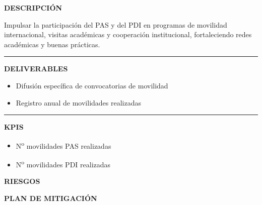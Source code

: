\documentclass[11pt,a4paper]{scrreprt}
\newcommand{\fieldlabel}[1]{%
  {\footnotesize\sffamily\bfseries\color{mutedcolor}\MakeUppercase{#1}}\par\nopagebreak[4]
}
\newcommand{\fieldsep}{\vspace{3pt}\noindent\textcolor{bordercolor}{\rule{\linewidth}{0.4pt}}\vspace{3pt}\par}
\begin{document}
\begin{tcolorbox}[pabox={fgcolor}{PA5.2 \enspace\textbullet\enspace Fomentar la movilidad de PAS y PDI}]

\fieldlabel{Descripci\'on}
{\small Impulsar la participación del PAS y del PDI en programas de movilidad internacional, visitas académicas y cooperación institucional, fortaleciendo redes académicas y buenas prácticas.}\par
\fieldsep
\fieldlabel{Deliverables}
{\small \begin{itemize}[noitemsep,topsep=2pt]
\item Difusión específica de convocatorias de movilidad
\item Registro anual de movilidades realizadas
\end{itemize}}\par
\fieldsep
\fieldlabel{KPIs}
{\small \begin{itemize}[noitemsep,topsep=2pt]
\item N\textsuperscript{o} movilidades PAS realizadas
\item N\textsuperscript{o} movilidades PDI realizadas
\end{itemize}}\par
\end{tcolorbox}
\begin{tcolorbox}[riskbox]
{\footnotesize\sffamily\bfseries\color{red!50!black} RIESGOS}\par{}
\end{tcolorbox}
\begin{tcolorbox}[mitbox]
{\footnotesize\sffamily\bfseries\color{green!40!black} PLAN DE MITIGACI\'ON}\par{}
\end{tcolorbox}
\vspace{8pt}
\end{document}
